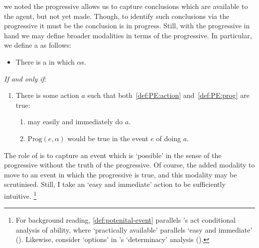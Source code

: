 \begin{note}
  we noted the progressive allows us to capture conclusions which are available to the agent, but not yet made.
  Though, to identify such conclusions via the progressive it must be the conclusion is in progress.
  Still, with the progressive in hand we may define broader modalities in terms of the progressive.
  In particular, we define a \pevent{} as follows:

  \begin{definition}[\pevent{3}]
    \label{def:potenital-event}

    \begin{itemize}
    \item
      There is a \emph{\pevent{}} in which \vAgent{} \(\alpha\)s.
    \end{itemize}

    \emph{If and only if}:

    \begin{enumerate}[label=]
    \item
      There is some action \(a\) such that both~\ref{def:PE:action} and~\ref{def:PE:prog} are true:
      \begin{enumerate}[label=\alph*., ref=(\alph*)]
      \item
        \label{def:PE:action}
        \vAgent{} may easily and immediately do \(a\).
      \item
        \label{def:PE:prog}
        \(\text{Prog}(e, \alpha)\) would be true in the event \(e\) of \vAgent{} doing \(a\).
      \end{enumerate}
    \end{enumerate}
    \vspace{-\baselineskip}
  \end{definition}

  The role of  is to capture an event which is `possible' in the sense of the progressive without the truth of the progressive.
  Of course, the added modality to move to an event in which the progressive is true, and this modality may be scrutinised.
  Still, I take an `easy and immediate' action to be sufficiently intuitive.%
  \footnote{
    For background reading, \autoref{def:potenital-event} parallels \citeauthor{Mandelkern:2017aa}'s act conditional analysis of ability, where `practically available' parallels `easy and immediate' (\citeyear[\S5]{Mandelkern:2017aa}).
    Likewise, consider `options' in \citeauthor{Boylan:2020aa}'s `determinacy' analysis (\citeyear[\S4]{Boylan:2020aa}).
  }
\end{note}

